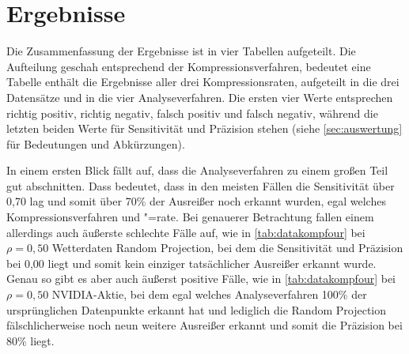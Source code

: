 \section{Ergebnisse}
Die Zusammenfassung der Ergebnisse ist in vier Tabellen aufgeteilt. Die Aufteilung geschah entsprechend der Kompressionsverfahren, bedeutet eine Tabelle enthält die Ergebnisse aller drei Kompressionsraten, aufgeteilt in die drei Datensätze und in die vier Analyseverfahren. Die ersten vier Werte entsprechen richtig positiv, richtig negativ, falsch positiv und falsch negativ, während die letzten beiden Werte für Sensitivität und Präzision stehen (siehe \autoref{sec:auswertung} für Bedeutungen und Abkürzungen).

In einem ersten Blick fällt auf, dass die Analyseverfahren zu einem großen Teil gut abschnitten. Dass bedeutet, dass in den meisten Fällen die Sensitivität über 0,70 lag und somit über 70\% der Ausreißer noch erkannt wurden, egal welches Kompressionsverfahren und "=rate. Bei genauerer Betrachtung fallen einem allerdings auch äußerste schlechte Fälle auf, wie in \autoref{tab:datakompfour} bei $\rho=0,50$ Wetterdaten Random Projection, bei dem die Sensitivität und Präzision bei 0,00 liegt und somit kein einziger tatsächlicher Ausreißer erkannt wurde. Genau so gibt es aber auch äußerst positive Fälle, wie in \autoref{tab:datakompfour} bei $\rho=0,50$ NVIDIA-Aktie, bei dem egal welches Analyseverfahren 100\% der ursprünglichen Datenpunkte erkannt hat und lediglich die Random Projection fälschlicherweise noch neun weitere Ausreißer erkannt und somit die Präzision bei 80\% liegt.


